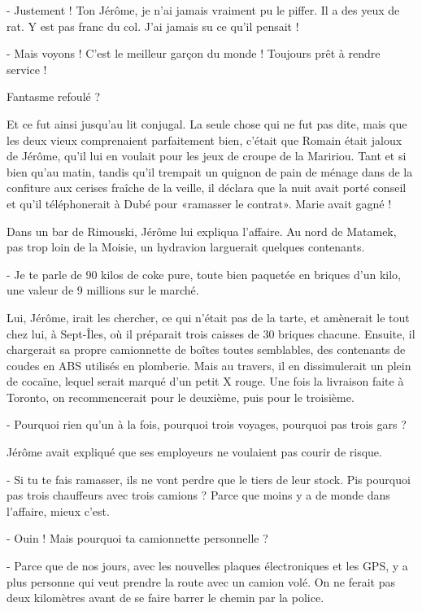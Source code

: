 - Justement ! Ton Jérôme, je n’ai jamais vraiment pu le piffer. Il a des yeux de rat. Y est pas franc du col. J’ai jamais su ce qu’il pensait !

- Mais voyons ! C’est le meilleur garçon du monde ! Toujours prêt à rendre service !

Fantasme refoulé ?

Et ce fut ainsi jusqu’au lit conjugal. La seule chose qui ne fut pas dite, mais que les deux vieux comprenaient parfaitement bien, c’était que Romain était jaloux de Jérôme, qu’il lui en voulait pour les jeux de croupe de la Maririou. Tant et si bien qu’au matin, tandis qu’il trempait un quignon de pain de ménage dans de la confiture aux cerises fraîche de la veille, il déclara que la nuit avait porté conseil et qu’il téléphonerait à Dubé pour «ramasser le contrat». Marie avait gagné !

Dans un bar de Rimouski, Jérôme lui expliqua l’affaire. Au nord de Matamek, pas trop loin de la Moisie, un hydravion larguerait quelques contenants.

- Je te parle de 90 kilos de coke pure, toute bien paquetée en briques d’un kilo, une valeur de 9 millions sur le marché.

Lui, Jérôme, irait les chercher, ce qui n’était pas de la tarte, et amènerait le tout chez lui, à Sept-Îles, où il préparait trois caisses de 30 briques chacune. Ensuite, il chargerait sa propre camionnette de boîtes toutes semblables, des contenants de coudes en ABS utilisés en plomberie. Mais au travers, il en dissimulerait un plein de cocaïne, lequel serait marqué d’un petit X rouge. Une fois la livraison faite à Toronto, on recommencerait pour le deuxième, puis pour le troisième.

- Pourquoi rien qu’un à la fois, pourquoi trois voyages, pourquoi pas trois gars ?

Jérôme avait expliqué que ses employeurs ne voulaient pas courir de risque.

- Si tu te fais ramasser, ils ne vont perdre que le tiers de leur stock. Pis pourquoi pas trois chauffeurs avec trois camions ? Parce que moins y a de monde dans l’affaire, mieux c’est.

- Ouin ! Mais pourquoi ta camionnette personnelle ?

- Parce que de nos jours, avec les nouvelles plaques électroniques et les GPS, y a plus personne qui veut prendre la route avec un camion volé. On ne ferait pas deux kilomètres avant de se faire barrer le chemin par la police.

